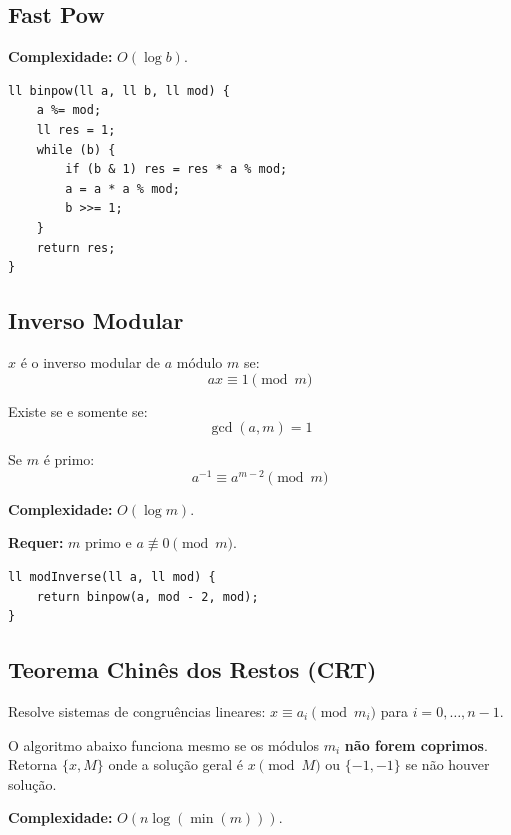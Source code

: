 \subsection{Fast Pow}

\textbf{Complexidade:} $O(\log b)$.

\begin{lstlisting}
ll binpow(ll a, ll b, ll mod) {
    a %= mod;
    ll res = 1;
    while (b) {
        if (b & 1) res = res * a % mod;
        a = a * a % mod;
        b >>= 1;
    }
    return res;
}
\end{lstlisting}


\subsection{Inverso Modular}

$ x $ é o inverso modular de $a$ módulo $m$ se:
\[
a x \equiv 1 \pmod m
\]

Existe se e somente se:
\[
\gcd(a,m)=1
\]

Se $m$ é primo:
\[
a^{-1} \equiv a^{m-2} \pmod m
\]

\textbf{Complexidade:} $O(\log m)$.

\textbf{Requer:} $m$ primo e $a \not\equiv 0 \pmod m$.

\begin{lstlisting}
ll modInverse(ll a, ll mod) {
    return binpow(a, mod - 2, mod);
}
\end{lstlisting}


\subsection{Teorema Chinês dos Restos (CRT)}

Resolve sistemas de congruências lineares:
$x \equiv a_i \pmod{m_i}$ para $i = 0, \dots, n-1$.

O algoritmo abaixo funciona mesmo se os módulos $m_i$ \textbf{não forem coprimos}. Retorna $\{x, M\}$ onde a solução geral é $x \pmod M$ ou $\{-1, -1\}$ se não houver solução.

\textbf{Complexidade:} $O(n \log(\min(m)))$.

